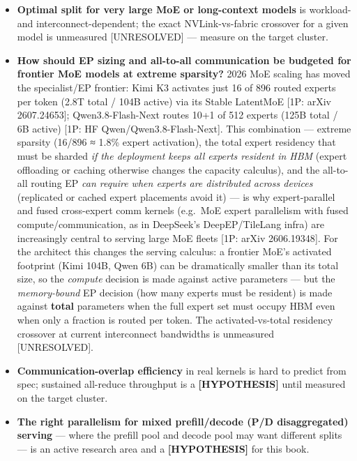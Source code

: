 \label{what-we-still-dont-know}


\begin{itemize}
\item
  \textbf{Optimal split for very large MoE or long-context models} is
  workload- and interconnect-dependent; the exact NVLink-vs-fabric
  crossover for a given model is unmeasured \mbox{{[}UNRESOLVED{]}} --- measure
  on the target cluster.
\item
  \textbf{How should EP sizing and all-to-all communication be budgeted
  for frontier MoE models at extreme sparsity?} 2026 MoE scaling has
  moved the specialist/EP frontier: Kimi K3 activates just 16 of 896
  routed experts per token (2.8T total / 104B active) via its Stable
  LatentMoE {[}1P: arXiv 2607.24653{]}; Qwen3.8-Flash-Next routes 10+1
  of 512 experts (125B total / 6B active) {[}1P: HF
  Qwen/Qwen3.8-Flash-Next{]}. This combination --- extreme sparsity
  (16/896 ≈ 1.8\% expert activation), the total expert residency that
  must be sharded \emph{if the deployment keeps all experts resident in
  HBM} (expert offloading or caching otherwise changes the capacity
  calculus), and the all-to-all routing EP \emph{can require when
  experts are distributed across devices} (replicated or cached expert
  placements avoid it) --- is why expert-parallel and fused cross-expert
  comm kernels (e.g.~MoE expert parallelism with fused
  compute/communication, as in DeepSeek's DeepEP/TileLang infra) are
  increasingly central to serving large MoE fleets {[}1P: arXiv
  2606.19348{]}. For the architect this changes the serving calculus: a
  frontier MoE's activated footprint (Kimi 104B, Qwen 6B) can be
  dramatically smaller than its total size, so the \emph{compute}
  decision is made against active parameters --- but the
  \emph{memory-bound} EP decision (how many experts must be resident) is
  made against \textbf{total} parameters when the full expert set must
  occupy HBM even when only a fraction is routed per token. The
  activated-vs-total residency crossover at current interconnect
  bandwidths is unmeasured \mbox{{[}UNRESOLVED{]}}.
\item
  \textbf{Communication-overlap efficiency} in real kernels is hard to
  predict from spec; sustained all-reduce throughput is a
  \textbf{\mbox{{[}HYPOTHESIS{]}}} until measured on the target cluster.
\item
  \textbf{The right parallelism for mixed prefill/decode (P/D
  disaggregated) serving} --- where the prefill pool and decode pool may
  want different splits --- is an active research area and a
  \textbf{\mbox{{[}HYPOTHESIS{]}}} for this book.
\end{itemize}

